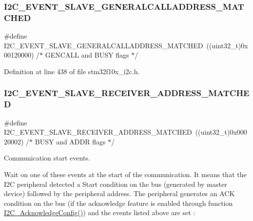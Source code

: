 \subsubsection{\texorpdfstring{I2\+C\+\_\+\+E\+V\+E\+N\+T\+\_\+\+S\+L\+A\+V\+E\+\_\+\+G\+E\+N\+E\+R\+A\+L\+C\+A\+L\+L\+A\+D\+D\+R\+E\+S\+S\+\_\+\+M\+A\+T\+C\+H\+ED}{I2C\_EVENT\_SLAVE\_GENERALCALLADDRESS\_MATCHED}}
{\footnotesize\ttfamily \#define I2\+C\+\_\+\+E\+V\+E\+N\+T\+\_\+\+S\+L\+A\+V\+E\+\_\+\+G\+E\+N\+E\+R\+A\+L\+C\+A\+L\+L\+A\+D\+D\+R\+E\+S\+S\+\_\+\+M\+A\+T\+C\+H\+ED~((uint32\+\_\+t)0x00120000)  /$\ast$ G\+E\+N\+C\+A\+L\+L and B\+U\+S\+Y flags $\ast$/}



Definition at line 438 of file stm32f10x\+\_\+i2c.\+h.

\mbox{\label{group___i2_c___events_ga6cf0e334704618b024eee604849f50f7}} 
\subsubsection{\texorpdfstring{I2\+C\+\_\+\+E\+V\+E\+N\+T\+\_\+\+S\+L\+A\+V\+E\+\_\+\+R\+E\+C\+E\+I\+V\+E\+R\+\_\+\+A\+D\+D\+R\+E\+S\+S\+\_\+\+M\+A\+T\+C\+H\+ED}{I2C\_EVENT\_SLAVE\_RECEIVER\_ADDRESS\_MATCHED}}
{\footnotesize\ttfamily \#define I2\+C\+\_\+\+E\+V\+E\+N\+T\+\_\+\+S\+L\+A\+V\+E\+\_\+\+R\+E\+C\+E\+I\+V\+E\+R\+\_\+\+A\+D\+D\+R\+E\+S\+S\+\_\+\+M\+A\+T\+C\+H\+ED~((uint32\+\_\+t)0x00020002) /$\ast$ B\+U\+S\+Y and A\+D\+D\+R flags $\ast$/}



Communication start events. 

Wait on one of these events at the start of the communication. It means that the I2C peripheral detected a Start condition on the bus (generated by master device) followed by the peripheral address. The peripheral generates an A\+CK condition on the bus (if the acknowledge feature is enabled through function \hyperlink{group___i2_c___exported___functions_ga7bb44e894d68a7991f564c43fb187486}{I2\+C\+\_\+\+Acknowledge\+Config()}) and the events listed above are set \+:

